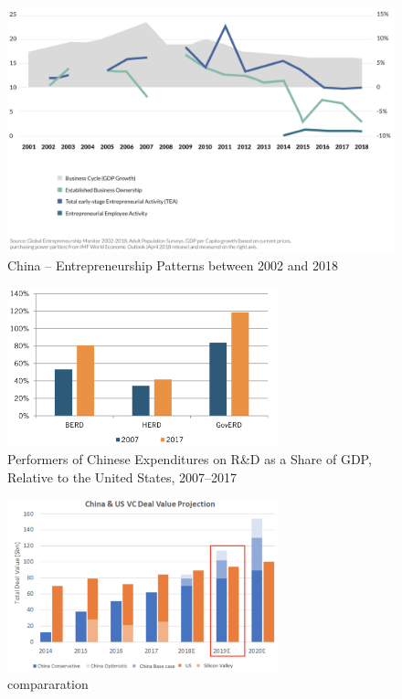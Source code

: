\documentclass[10pt]{article}
\begin{document}
\begin{figure}[h]
\centerline{\includegraphics[width = 1\textwidth]{screenshot//2_4.png}}
\caption{China – Entrepreneurship Patterns between 2002 and 2018}
\label{fig_China_acrosstime}
\end{figure}

\begin{figure}[h]
\centerline{\includegraphics[width = 0.7\textwidth]{screenshot//3_1.png}}
\caption{Performers of Chinese Expenditures on R\&D as a Share of GDP, Relative to the United States, 2007–2017}
\label{fig_RD}
\end{figure}

\begin{figure}[h]
\centerline{\includegraphics[width = 0.7\textwidth]{screenshot//4_1.png}}
\caption{compararation}
\label{fig_4_1}
\end{figure}
\end{document}
